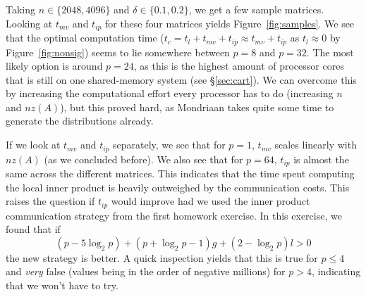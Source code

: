 \documentclass[11pt]{amsart}
\theoremstyle{definition}
\begin{document}
Taking $n \in \{2048, 4096\}$ and $\delta \in \{0.1, 0.2\}$, we get a few sample matrices. Looking at $t_{mv}$ and $t_{ip}$ for these four matrices yields Figure~\ref{fig:samples}. We see that the optimal computation time ($t_c = t_l + t_{mv} + t_{ip} \approx t_{mv} + t_{ip}$ as $t_l \approx 0$ by Figure~\ref{fig:nonsig}) seems to lie somewhere between $p=8$ and $p=32$. The most likely option is around $p=24$, as this is the highest amount of processor cores that is still on one shared-memory system (see \S \ref{sec:cart}). We can overcome this by increasing the computational effort every processor has to do (increasing $n$ and $nz(A)$), but this proved hard, as Mondriaan takes quite some time to generate the distributions already.

If we look at $t_{mv}$ and $t_{ip}$ separately, we see that for $p=1$, $t_{mv}$ scales linearly with $nz(A)$ (as we concluded before). We also see that for $p=64$, $t_{ip}$ is almost the same across the different matrices. This indicates that the time spent computing the local inner product is heavily outweighed by the communication costs. This raises the question if $t_{ip}$ would improve had we used the inner product communication strategy from the first homework exercise. \cite{TODOHUISWERK} In this exercise, we found that if
\[
  (p - 5\log_2 p) + (p + \log_2 p - 1)g + (2-\log_2 p)l > 0
\]
the new strategy is better. A quick inspection yields that this is true for $p \leq 4$ and \emph{very} false (values being in the order of negative millions) for $p > 4$, indicating that we won't have to try.
\end{document}
